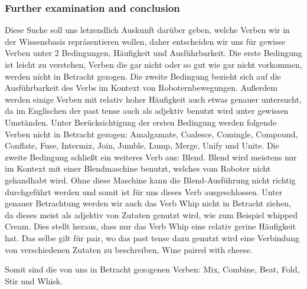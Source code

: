   \subsubsection*{Further examination and conclusion}
  Diese Suche soll uns letzendlich Auskunft darüber geben, welche Verben wir in der Wissensbasis repräsentieren wollen, daher entscheiden wir uns für gewisse Verben unter 2 Bedingungen, Häufigkeit und Ausführbarkeit. Die erste Bedingung ist leicht zu verstehen, Verben die gar nicht oder so gut wie gar nicht vorkommen, werden nicht in Betracht gezogen. Die zweite Bedingung bezieht sich auf die Ausführbarkeit des Verbs im Kontext von Roboternbewegungen. Außerdem werden einige Verben mit relativ hoher Häufigkeit auch etwas genauer untersucht, da im Englischen der past tense auch als adjektiv benutzt wird unter gewissen Umständen.
  Unter Berücksichtigung der ersten Bedingung werden folgende Verben nicht in Betracht gezogen: Amalgamate, Coalesce, Comingle, Compound, Conflate, Fuse, Intermix, Join, Jumble, Lump, Merge, Unify und Unite.
  Die zweite Bedingung schließt ein weiteres Verb aus: Blend. Blend wird meistens nur im Kontext mit einer Blendmaschine benutzt, welches vom Roboter nicht gehandhabt wird. Ohne diese Maschine kann die Blend-Ausführung nicht richtig durchgeführt werden und somit ist für uns dieses Verb ausgeschlossen.
  Unter genauer Betrachtung werden wir auch das Verb Whip nicht in Betracht ziehen, da dieses meist als adjektiv von Zutaten genutzt wird, wie zum Beispiel whipped Cream. Dies stellt heraus, dass nur das Verb Whip eine relativ gerine Häufigkeit hat. Das selbe gilt für pair, wo das past tense dazu genutzt wird eine Verbindung von verschiedenen Zutaten zu beschreiben, Wine paired with cheese.

  Somit sind die von uns in Betracht gezogenen Verben: Mix, Combine, Beat, Fold, Stir und Whisk.
  

